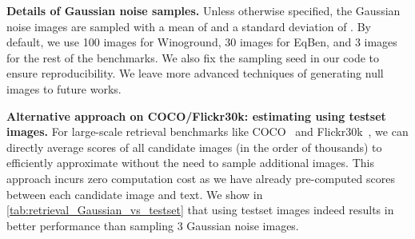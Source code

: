 \documentclass{article} \usepackage{iclr2024_conference,times}
\begin{document}
\begin{table}[h]

\centering
{}
\caption{\small {\bf Comparing sampling of Gaussian noise images and trainset images 
for estimating .} We report text scores of -debiasing on Winoground I-to-T retrieval task. We ablate 3/10/100/1000 Gaussian noise and LAION samples and report both mean and std using 5 sampling seeds. The optimal  is searched on testset via a step size of . The Gaussian noise images are sampled with a mean calculated from the LAION subset and a fixed std of . }
\label{tab:sampling_test}


\end{table}



{\bf Details of Gaussian noise samples. } Unless otherwise specified, the Gaussian noise images are sampled with a mean of  and a standard deviation of . By default, we use 100 images for Winoground, 30 images for EqBen, and 3 images for the rest of the benchmarks. We also fix the sampling seed in our code to ensure reproducibility. We leave more advanced techniques of generating null images to future works.

{\bf Alternative approach on COCO/Flickr30k: estimating  using testset images. } For large-scale retrieval benchmarks like COCO~\citep{coco} and Flickr30k~\citep{flickr30k}, we can directly average scores of all candidate images (in the order of thousands) to efficiently approximate  without the need to sample additional images. This approach incurs zero computation cost as we have already pre-computed scores between each candidate image and text. We show in \autoref{tab:retrieval_Gaussian_vs_testset} that using testset images indeed results in better performance than sampling 3 Gaussian noise images.
\end{document}
